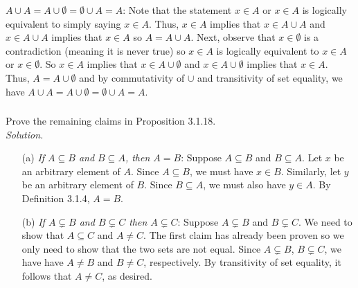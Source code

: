 \documentclass{amsart}
\theoremstyle{definition}
\newcommand{\soln}{\newline\textit{Solution.} }
\begin{document}
\textit{$A\cup A=A\cup\emptyset=\emptyset\cup A=A$}: Note that the statement $x\in A$ or $x\in A$ is logically equivalent to simply saying $x\in A$. Thus, $x\in A$ implies that $x\in A\cup A$ and $x\in A\cup A$ implies that $x\in A$ so $A=A\cup A$. Next, observe that $x\in\emptyset$ is a contradiction (meaning it is never true) so $x\in A$ is logically equivalent to $x\in A$ or $x\in\emptyset$. So $x\in A$ implies that $x\in A\cup\emptyset$ and $x\in A\cup\emptyset$ implies that $x\in A$. Thus, $A=A\cup\emptyset$ and by commutativity of $\cup$ and transitivity of set equality, we have $A\cup A=A\cup\emptyset=\emptyset\cup A=A$. \\

\subsubsection{} Prove the remaining claims in Proposition 3.1.18. \\
\soln 
\begin{enumerate}
\item[(a)] \textit{If $A\subseteq B$ and $B\subseteq A$, then $A=B$}: Suppose $A\subseteq B$ and $B\subseteq A$. Let $x$ be an arbitrary element of $A$. Since $A\subseteq B$, we must have $x\in B$. Similarly, let $y$ be an arbitrary element of $B$. Since $B\subseteq A$, we must also have $y\in A$. By Definition 3.1.4, $A=B$. \\
\item[(b)] \textit{If $A\subsetneq B$ and $B\subsetneq C$ then $A\subsetneq C$}: Suppose $A\subsetneq B$ and $B\subsetneq C$. We need to show that $A\subseteq C$ and $A\neq C$. The first claim has already been proven so we only need to show that the two sets are not equal. Since $A\subsetneq B$, $B\subsetneq C$, we have have $A\neq B$ and $B\neq C$, respectively. By transitivity of set equality, it follows that $A\neq C$, as desired. \\
\end{enumerate}
\end{document}

